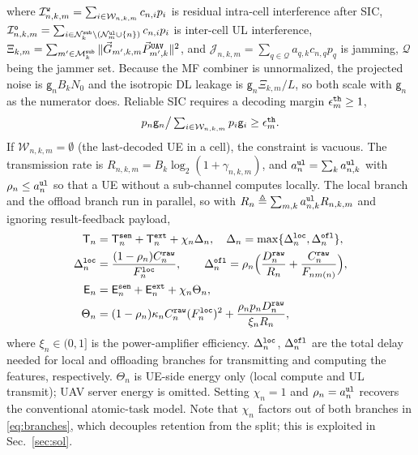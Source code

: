 \documentclass[journal]{IEEEtran}
\begin{document}
where $\mathcal{I}_{n,k,m}^{\tt w}=\sum_{i\in\mathcal{W}_{n,k,m}}c_{n,i} p_i$ is residual intra-cell interference after SIC,
$\mathcal{I}_{n,k,m}^{\tt o}=\sum_{i\in\mathcal{N}_k^{\tt sub}\setminus(\mathcal{N}_m^{\tt ul}\cup\{n\})}c_{n,i} p_i$ is inter-cell UL interference,
$\Xi_{k,m}=\sum_{m'\in\mathcal{M}_k^{\tt sub}}\Vert\vec{G}_{m',k,m}\vec{P}_{m',k}^{\tt UAV}\Vert^2$, and
$\mathcal{J}_{n,k,m}=\sum_{q\in\mathcal{Q}}a_{q,k}c_{n,q} p_q$ is jamming, $\mathcal{Q}$ being the jammer set. 
Because the MF combiner is unnormalized, the projected noise is $\mathsf{g}_nB_kN_0$ and the isotropic DL leakage is $\mathsf{g}_n\Xi_{k,m}/L$, so both scale with $\mathsf{g}_n$ as the numerator does.
Reliable SIC requires a decoding margin $\epsilon_m^{\tt th}\ge1$,
\begin{equation}
\textstyle p_n\mathsf{g}_n\big/\sum_{i\in\mathcal{W}_{n,k,m}}p_i\mathsf{g}_i\ge\epsilon_m^{\tt th}.
\label{eq:sic}
\end{equation}
{\color{blue}If $\mathcal{W}_{n,k,m}=\emptyset$ (the last-decoded UE in a cell), the constraint is vacuous.}
The transmission rate is $R_{n,k,m}=B_k\log_2(1+\gamma_{n,k,m})$, and $a_n^{\tt ul}=\sum_k a_{n,k}^{\tt ul}$ with $\rho_n\le a_n^{\tt ul}$ so that a UE without a sub-channel computes locally. The local branch and the offload branch run in parallel, so with $R_n\triangleq\sum_{m,k}a_{n,k}^{\tt ul}R_{n,k,m}$ and ignoring result-feedback payload,
\begin{align}
\mathsf{T}_n&=\mathsf{T}_n^{\tt sen}+\mathsf{T}_n^{\tt ext}+\chi_n\Delta_n,
\quad
\Delta_n=\max\{\Delta_n^{\tt loc},\Delta_n^{\tt ofl}\},
\label{eq:Tn}\\
\Delta_n^{\tt loc}&=\frac{(1-\rho_n)C_n^{\tt raw}}{F_n^{\tt loc}},
\qquad
\Delta_n^{\tt ofl}=\rho_n\Big(\frac{D_n^{\tt raw}}{R_n}+\frac{C_n^{\tt raw}}{F_{n m(n)}}\Big),
\label{eq:branches}\\
\mathsf{E}_n&=\mathsf{E}_n^{\tt sen}+\mathsf{E}_n^{\tt ext}+\chi_n\Theta_n,
\label{eq:En}\\
\Theta_n&=(1-\rho_n)\kappa_n C_n^{\tt raw}(F_n^{\tt loc})^2+\frac{\rho_n p_n D_n^{\tt raw}}{\xi_n R_n},
\label{eq:Theta}
\end{align}
where $\xi_n\in(0,1]$ is the power-amplifier efficiency.
{\color{blue}$\Delta_n^{\tt loc}$, $\Delta_n^{\tt ofl}$ are the total delay needed for local and offloading branches for transmitting and computing the features, respectively. }
$\Theta_n$ is UE-side energy only (local compute and UL transmit); UAV server energy is omitted.
Setting $\chi_n=1$ and $\rho_n=a_n^{\tt ul}$ recovers the conventional atomic-task model. Note that $\chi_n$ factors out of both branches in \eqref{eq:branches}, which decouples retention from the split; this is exploited in Sec.~\ref{sec:sol}.
\end{document}
